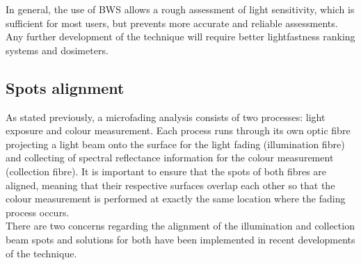 In general, the use of \gls{BWS} allows a rough assessment of light sensitivity, which is sufficient for most users, but prevents more accurate and reliable assessments. Any further development of the technique will require better lightfastness ranking systems and dosimeters.\\

\newpage
\subsection{Spots alignment}

As stated previously, a microfading analysis consists of two processes: light exposure and colour measurement. Each process runs through its own optic fibre projecting a light beam onto the surface for the light fading (illumination fibre) and collecting of spectral reflectance information for the colour measurement (collection fibre). It is important to ensure that the spots of both fibres are aligned, meaning that their respective surfaces overlap each other so that the colour measurement is performed at exactly the same location where the fading process occurs.\\

There are two concerns regarding the alignment of the illumination and collection beam spots and solutions for both have been implemented in recent developments of the technique.

